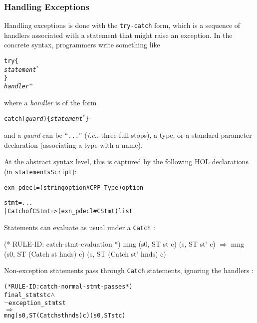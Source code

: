 \documentclass[11pt]{article}
\newcommand{\ie}{\emph{i.e.}}
\begin{document}
\subsubsection{Handling Exceptions}

Handling exceptions is done with the \texttt{try-catch} form, which is a
sequence of handlers associated with a statement that might raise an
exception.  In the concrete syntax, programmers write something like
\newcommand{\suplus}{\ensuremath{^+}}
\newcommand{\sustar}{\ensuremath{^*}}
\begin{alltt}
   try \{
     \emph{statement}\sustar
   \}
   \emph{handler}\suplus
\end{alltt}
where a \emph{handler} is of the form
\begin{alltt}
   catch (\emph{guard}) \{ \emph{statement}\sustar \}
\end{alltt}
and a \emph{guard} can be ``\texttt{...}'' (\ie, three full-stops), a
type, or a standard parameter declaration (associating a type with a
name).

At the abstract syntax level, this is captured by the following HOL
declarations (in \texttt{statementsScript}):
\begin{alltt}
   exn_pdecl = (string option # CPP_Type) option

   stmt = ...
        | Catch of CStmt => (exn_pdecl # CStmt) list
\end{alltt}

\bigskip
\noindent
Statements can evaluate as usual under a \texttt{Catch}
:
%
%
\begin{stdrule}
(* RULE-ID: catch-stmt-evaluation *)
     mng (s0, ST st c) (s, ST st' c)
   \(\Rightarrow\)
     mng (s0, ST (Catch st hnds) c) (s, ST (Catch st' hnds) c)
\end{stdrule}
Non-exception statements pass through \texttt{Catch} statements,
ignoring the handlers :
\begin{center}
\begin{minipage}{\textwidth}
%
\begin{alltt}
(* RULE-ID: catch-normal-stmt-passes *)
     final_stmt st c \(\land\)
     \(\neg\)exception_stmt st
   \(\Rightarrow\)
     mng (s0, ST (Catch st hnds) c) (s0, ST st c)
\end{alltt}
\end{minipage}
\end{center}
\end{document}
